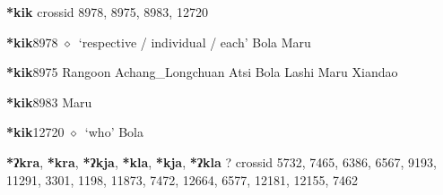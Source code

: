 \item
\textbf{*kik}
  {\tiny crossid 8978, 8975, 8983, 12720}
  \begin{list}{}{\leftmargin=1.5em \itemindent=-1.5em}
  \item {\footnotesize \textbf{*kik}}{\tiny 8978}
         $\diamond$~`respective / individual / each'
         Bola 
\hspace{1ex}
         Maru 
  \item {\footnotesize \textbf{*kik}}{\tiny 8975}
\hspace{1ex}
         Rangoon 
\hspace{1ex}
         Achang\_Longchuan 
\hspace{1ex}
         Atsi 
\hspace{1ex}
         Bola 
\hspace{1ex}
         Lashi 
\hspace{1ex}
         Maru 
\hspace{1ex}
         Xiandao 
  \item {\footnotesize \textbf{*kik}}{\tiny 8983}
\hspace{1ex}
         Maru 
  \item {\footnotesize \textbf{*kik}}{\tiny 12720}
\hspace{1ex}
         $\diamond$~`who'
         Bola 
  \end{list}
\item
\textbf{*ʔkra}, \textbf{*kra}, \textbf{*ʔkja}, \textbf{*kla}, \textbf{*kja}, \textbf{*ʔkla}
?
  {\tiny crossid 5732, 7465, 6386, 6567, 9193, 11291, 3301, 1198, 11873, 7472, 12664, 6577, 12181, 12155, 7462}
